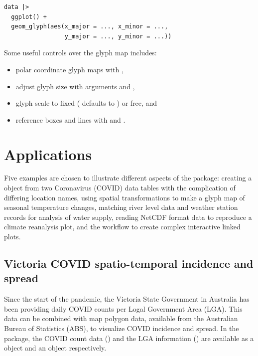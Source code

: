 \documentclass[
  shortnames]{jss}
\providecommand{\tightlist}{%
  \setlength{\itemsep}{0pt}\setlength{\parskip}{0pt}}
\begin{document}
\begin{verbatim}
data |> 
  ggplot() +
  geom_glyph(aes(x_major = ..., x_minor = ..., 
                 y_major = ..., y_minor = ...))
\end{verbatim}

Some useful controls over the glyph map includes:

\begin{itemize}
\tightlist
\item
  polar coordinate glyph maps with ,
\item
  adjust glyph size with arguments  and ,
\item
  glyph scale to fixed ( defaults to ) or free, and
\item
  reference boxes and lines with  and .
\end{itemize}

\hypertarget{examples}{%
\section{Applications}\label{examples}}

Five examples are chosen to illustrate different aspects of the  package: creating a  object from two Coronavirus (COVID) data tables with the complication of differing location names, using spatial transformations to make a glyph map of seasonal temperature changes, matching river level data and weather station records for analysis of water supply, reading NetCDF format data to reproduce a climate reanalysis plot, and the workflow to create complex interactive linked plots.

\hypertarget{covid}{%
\subsection{Victoria COVID spatio-temporal incidence and spread}\label{covid}}

Since the start of the pandemic, the Victoria State Government in Australia has been providing daily COVID counts per Logal Government Area (LGA). This data can be combined with map polygon data, available from the Australian Bureau of Statistics (ABS), to visualize COVID incidence and spread. In the  package, the COVID count data () and the LGA information () are available as a  object and an  object respectively.
\end{document}
